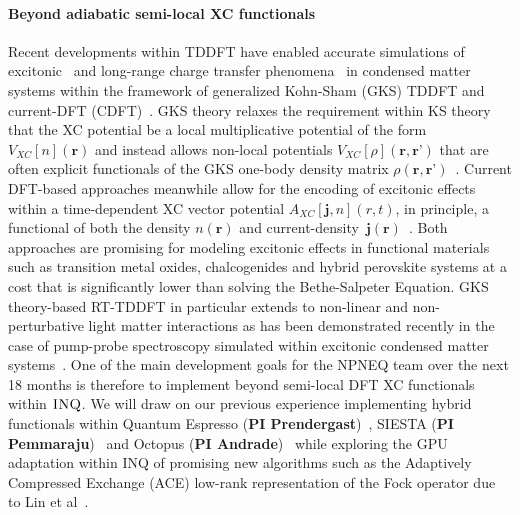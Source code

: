 \paragraph{Beyond adiabatic semi-local XC functionals}  Recent developments within TDDFT have enabled accurate simulations of excitonic~\cite{Ullrich2014b, Refaely-Abramson2015a, Pemmaraju2018b} and long-range charge transfer phenomena~\cite{Kummel2017} in condensed matter systems within the framework of generalized Kohn-Sham (GKS) TDDFT and current-DFT (CDFT)~\cite{Sun2021}.  GKS theory relaxes the requirement within KS theory that the XC potential be a local multiplicative potential of the form $V_{XC}[n](\textbf{r})$ and instead allows non-local potentials $V_{XC}[\rho](\textbf{r},\textbf{r'} )$ that are often explicit functionals of the GKS one-body density matrix $\rho(\textbf{r},\textbf{r'})$~\cite{Baer2018}. Current DFT-based approaches meanwhile allow for the  encoding of excitonic effects within a time-dependent XC vector potential $A_{XC}[\textbf{j},n](r,t)$, in principle, a functional of both the density $n(\textbf{r})$ and current-density~$\textbf{j}(\textbf{r})$~\cite{Sun2021}. Both approaches are promising for  modeling excitonic effects in  functional materials such as transition metal oxides, chalcogenides and hybrid perovskite systems at a cost that is significantly lower than solving the Bethe-Salpeter Equation. GKS theory-based RT-TDDFT in particular extends to non-linear and non-perturbative light matter interactions as has been demonstrated recently in the case of pump-probe spectroscopy simulated within excitonic condensed matter systems~\cite{Pemmaraju2020}. One of the main development goals for the NPNEQ team over the next 18 months is therefore to implement beyond semi-local DFT XC functionals within $\textsc{INQ}$.  We will draw on our previous experience implementing hybrid functionals within Quantum Espresso (\textbf{PI Prendergast})~\cite{Barnes2017}, SIESTA (\textbf{PI Pemmaraju})~\cite{Pemmaraju2018b} and Octopus (\textbf{PI Andrade})~\cite{Andrade2015} while exploring the GPU adaptation within \textsc{INQ} of promising new algorithms such as the  Adaptively Compressed Exchange (ACE) low-rank representation of the Fock operator due to Lin et al~\cite{Lin2016}.   

